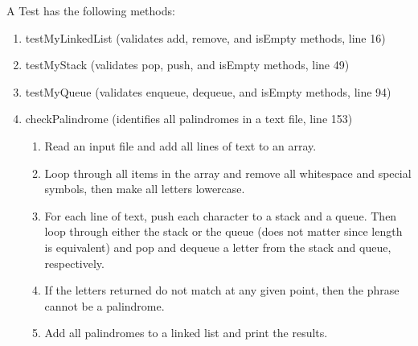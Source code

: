 \documentclass[letterpaper, 10pt,DIV=13]{scrartcl}
\numberwithin{equation}{section} %
\numberwithin{figure}{section} %
\numberwithin{table}{section} %
\begin{document}
A Test has the following methods: 
\begin{enumerate}
    \item testMyLinkedList (validates add, remove, and isEmpty methods, line 16)
    \item testMyStack (validates pop, push, and isEmpty methods, line 49)
    \item testMyQueue (validates enqueue, dequeue, and isEmpty methods, line 94)
    \item checkPalindrome (identifies all palindromes in a text file, line 153)
        \begin{enumerate}
            \item Read an input file and add all lines of text to an array.
            \item Loop through all items in the array and remove all whitespace and special symbols, then make all letters lowercase.
            \item For each line of text, push each character to a stack and a queue. Then loop through either the stack or the queue (does not matter since length is equivalent) and pop and dequeue a letter from the stack and queue, respectively. 
            \item If the letters returned do not match at any given point, then the phrase cannot be a palindrome.
            \item Add all palindromes to a linked list and print the results.
        \end{enumerate}
\end{enumerate}
\end{document}
